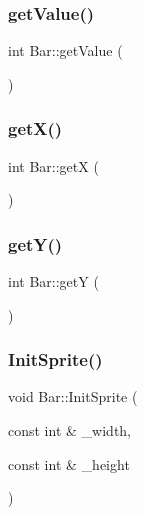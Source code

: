 \mbox{\label{class_bar_a60e69829339826a504d19d019c0daf15}} 
\subsubsection{\texorpdfstring{get\+Value()}{getValue()}}
{\footnotesize\ttfamily int Bar\+::get\+Value (\begin{DoxyParamCaption}{ }\end{DoxyParamCaption})\hspace{0.3cm}{\ttfamily [inline]}}

\mbox{\label{class_bar_a77082682857b8211de1b219ac62ef747}} 
\subsubsection{\texorpdfstring{get\+X()}{getX()}}
{\footnotesize\ttfamily int Bar\+::getX (\begin{DoxyParamCaption}{ }\end{DoxyParamCaption})\hspace{0.3cm}{\ttfamily [inline]}}

\mbox{\label{class_bar_af2b622c5aca08ec137927662a77bfef5}} 
\subsubsection{\texorpdfstring{get\+Y()}{getY()}}
{\footnotesize\ttfamily int Bar\+::getY (\begin{DoxyParamCaption}{ }\end{DoxyParamCaption})\hspace{0.3cm}{\ttfamily [inline]}}

\mbox{\label{class_bar_ad45cba6081a961ba5c52514548cee1bc}} 
\subsubsection{\texorpdfstring{Init\+Sprite()}{InitSprite()}}
{\footnotesize\ttfamily void Bar\+::\+Init\+Sprite (\begin{DoxyParamCaption}\item[{const int \&}]{\+\_\+width,  }\item[{const int \&}]{\+\_\+height }\end{DoxyParamCaption})}

